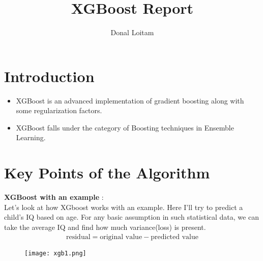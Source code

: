 \documentclass[a4paper, 11pt]{article}
\title{XGBoost Report}
\author{Donal Loitam}
\begin{document}
\maketitle
\tableofcontents

\section{Introduction}
\begin{itemize}
    \item XGBoost is an advanced implementation of gradient boosting along with some regularization factors.
    \item XGBoost falls under the category of Boosting techniques in Ensemble Learning.
\end{itemize}


\section{Key Points of the Algorithm}

    \textbf{XGBoost with an example}  :\\ Let’s look at how XGboost works with an example. Here I’ll try to predict a child’s IQ based on age.
    For any basic assumption in such statistical data, we can take the average IQ and find how much variance(loss) is present.
    \begin{align}
        \text{residual} = \text{original value} - \text{predicted value}
    \end{align}
     \begin{figure}[h!]
        \centering
        \texttt{[image: xgb1.png]}
        \label{fig:fig1}
      \end{figure}\\
\end{document}
